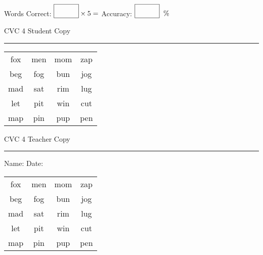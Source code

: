 \documentclass{memoir}
\begin{document}
\normalsize

Words Correct: $\fbox{\phantom{\huge 100}} \times 5 = $ Accuracy: $\fbox{\phantom{\huge 100}}\;\; \%$ 

\vfill

\newpage


\footnotesize \noindent
CVC 4 \hfill Student Copy
\smallskip
\hrule

\huge

\setlength{\tabcolsep}{14pt}
\def\arraystretch{2}

{\selectfont


\begin{vplace}[0.5]
\begin{center}
\begin{tabular}{cccc}
fox & men & mom & zap \\
beg & fog & bun & jog \\
mad & sat & rim & lug \\
let & pit & win & cut \\
map & pin & pup & pen \\
\end{tabular}
\end{center}
\end{vplace}

}

\newpage

\footnotesize \noindent
CVC 4 \hfill Teacher Copy
\smallskip
\hrule

\normalsize

\vfill

\noindent
Name: \underline{\hspace{1.75in}} \hfill Date: \underline{\hspace{1in}}

\huge

{\selectfont


\begin{vplace}[0.5]
\begin{center}
\begin{tabular}{cccc}
fox & men & mom & zap \\
beg & fog & bun & jog \\
mad & sat & rim & lug \\
let & pit & win & cut \\
map & pin & pup & pen \\
\end{tabular}
\end{center}
\end{vplace}



}
\end{document}
